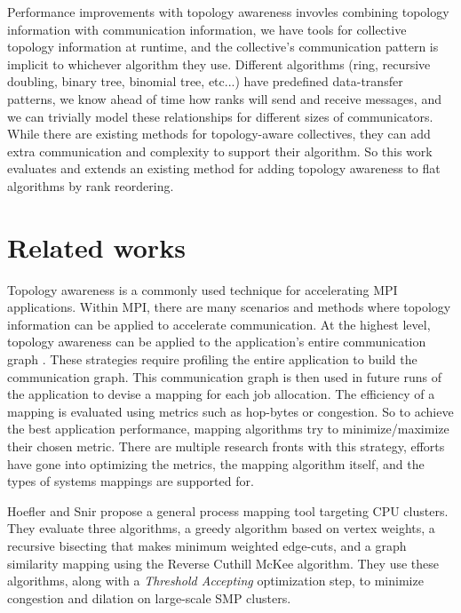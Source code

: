 Performance improvements with topology awareness invovles combining topology information with communication information, we have tools for collective topology information at runtime, and the collective's communication pattern is implicit to whichever algorithm they use.  
Different algorithms (ring, recursive doubling, binary tree, binomial tree, etc...) have predefined data-transfer patterns, we know ahead of time how ranks will send and receive messages, and we can trivially model these relationships for different sizes of communicators.
While there are existing methods for topology-aware collectives, they can add extra communication and complexity to support their algorithm. 
So this work evaluates and extends an existing method for adding topology awareness to flat algorithms by rank reordering.

\section{Related works}
Topology awareness is a commonly used technique for accelerating MPI applications. 
Within MPI, there are many scenarios and methods where topology information can be applied to accelerate communication.
At the highest level, topology awareness can be applied to the application's entire communication graph \cite{Hoefler2011GenericTopoMappingStrats, Mirsadeghi2016PTRAM, Faraji2016TopoAwareGPUSelection, Mirsadeghi2016MAGC, Galvez2017AutoTopoMap}.
These strategies require profiling the entire application to build the communication graph.
This communication graph is then used in future runs of the application to devise a mapping for each job allocation.
The efficiency of a mapping is evaluated using metrics such as hop-bytes or congestion.
So to achieve the best application performance, mapping algorithms try to minimize/maximize their chosen metric.
There are multiple research fronts with this strategy, efforts have gone into optimizing the metrics, the mapping algorithm itself, and the types of systems mappings are supported for.

Hoefler and Snir \cite{Hoefler2011GenericTopoMappingStrats} propose a general process mapping tool targeting CPU clusters.
They evaluate three algorithms, a greedy algorithm based on vertex weights, a recursive bisecting that makes minimum weighted edge-cuts, and a graph similarity mapping using the Reverse Cuthill McKee algorithm. 
They use these algorithms, along with a \textit{Threshold Accepting} optimization step, to minimize congestion and dilation on large-scale SMP clusters.


